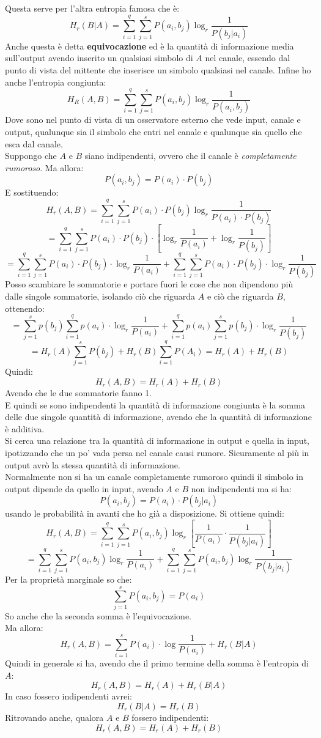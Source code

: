 \documentclass[a4paper,12pt, oneside]{book}
\begin{document}
Questa serve per l'altra entropia famosa che è:
\[H_r(B|A)=\sum_{i=1}^q\sum_{j=1}^s P(a_i,b_j)\log_r\frac{1}{P(b_j|a_i)}\]
Anche questa è detta \textbf{equivocazione} ed è la quantità di informazione
media sull'output avendo inserito un qualsiasi simbolo di $A$ nel canale,
essendo dal punto di vista del mittente che inserisce un simbolo qualsiasi nel
canale. 
Infine ho anche l'entropia congiunta:
\[H_R(A,B)=\sum_{i=1}^q\sum_{j=1}^s P(a_i,b_j)\log_r\frac{1}{P(a_i,b_j)}\]
Dove sono nel punto di vista di un osservatore esterno che vede input, canale e
output, qualunque sia il simbolo che entri nel canale e qualunque sia quello che
esca dal canale. \\
Suppongo che $A$ e $B$ siano indipendenti, ovvero che il canale è
\textit{completamente rumoroso}. Ma allora: 
\[P(a_i,b_j)=P(a_i)\cdot P(b_j)\]
E sostituendo:
\[H_r(A,B)=\sum_{i=1}^q\sum_{j=1}^s P(a_i)\cdot
  P(b_j)\log_r\frac{1}{P(a_i)\cdot P(b_j)}\]
\[=\sum_{i=1}^q\sum_{j=1}^s P(a_i)\cdot
  P(b_j)\cdot \left[\log_r\frac{1}{P(a_i)}+\log_r\frac{1}{P(b_j)}\right]\]
\[=\sum_{i=1}^q\sum_{j=1}^s P(a_i)\cdot
  P(b_j)\cdot \log_r\frac{1}{P(a_i)}+\sum_{i=1}^q\sum_{j=1}^s P(a_i)\cdot
  P(b_j)\cdot \log_r\frac{1}{P(b_j)}\]
Posso scambiare le sommatorie e portare fuori le cose che non dipendono più
dalle singole sommatorie, isolando ciò che riguarda $A$ e ciò che riguarda $B$,
ottenendo: 
\[=\sum_{j=1}^sp(b_j)\sum_{i=1}^qp(a_i)\cdot
  \log_r\frac{1}{P(a_i)}+\sum_{i=1}^qp(a_i)\sum_{j=1}^sp(b_j)\cdot
  \log_r\frac{1}{P(b_j)}\]
\[=H_r(A)\sum_{j=1}^sP(b_j)+H_r(B)\sum_{i=1}^qP(A_i)=H_r(A)+H_r(B)\]
Quindi:
\[H_r(A,B)=H_r(A)+H_r(B)\]
Avendo che le due sommatorie fanno 1.\\
E quindi se sono indipendenti la quantità di informazione congiunta è la somma
delle due singole quantità di informazione, avendo che la quantità di
informazione è additiva.\\
Si cerca una relazione tra la quantità di informazione in output e quella in
input, ipotizzando che un po' vada persa nel canale causi rumore. Sicuramente al
più in output avrò la stessa quantità di informazione. \\
Normalmente non si ha un canale completamente rumoroso quindi il simbolo in
output dipende da quello in input, avendo $A$ e $B$ non indipendenti ma si ha:
\[P(a_i,b_j)=P(a_i)\cdot P(b_j|a_i)\]
usando le probabilità in avanti che ho già a disposizione. Si ottiene quindi:
\[H_r(A,B)=\sum_{i=1}^q\sum_{j=1}^s P(a_i,b_j)\log_r\left[\frac{1}{P(a_i)}\cdot
    \frac{1}{P(b_j|a_i)}\right]\]
\[=\sum_{i=1}^q\sum_{j=1}^s
  P(a_i,b_j)\log_r\frac{1}{P(a_i)}+\sum_{i=1}^q\sum_{j=1}^s
  P(a_i,b_j)\log_r\frac{1}{P(b_j|a_i)}\]
Per la proprietà marginale so che:
\[\sum_{j=1}^s P(a_i,b_j)=P(a_i)\]
So anche che la seconda somma è l'equivocazione.\\
Ma allora:
\[H_r(A,B)=\sum_{i=1}^s P(a_i)\cdot \log\frac{1}{P(a_i)}+H_r(B|A)\]
Quindi in generale si ha, avendo che il primo termine della somma è l'entropia
di $A$:
\[H_r(A,B)=H_r(A)+H_r(B|A)\]
In caso fossero indipendenti avrei:
\[H_r(B|A)=H_r(B)\]
Ritrovando anche, qualora $A$ e $B$ fossero indipendenti:
\[H_r(A,B)=H_r(A)+H_r(B)\]
\end{document}
